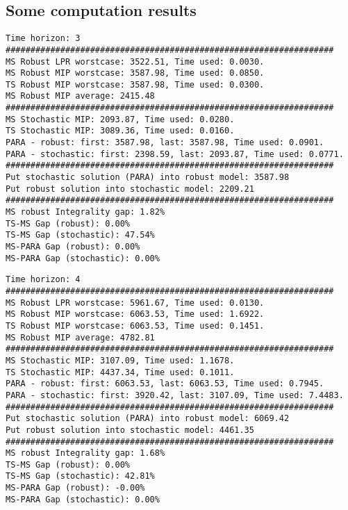 \documentclass[10pt]{article}
\theoremstyle{plain}
\theoremstyle{definition}
\theoremstyle{remark}
\begin{document}
\subsection*{Some computation results}
\begin{minipage}[t]{9cm}
\scriptsize
\begin{verbatim}
Time horizon: 3
##################################################################
MS Robust LPR worstcase: 3522.51, Time used: 0.0030.
MS Robust MIP worstcase: 3587.98, Time used: 0.0850.
TS Robust MIP worstcase: 3587.98, Time used: 0.0300.
MS Robust MIP average: 2415.48
##################################################################
MS Stochastic MIP: 2093.87, Time used: 0.0280.
TS Stochastic MIP: 3089.36, Time used: 0.0160.
PARA - robust: first: 3587.98, last: 3587.98, Time used: 0.0901.
PARA - stochastic: first: 2398.59, last: 2093.87, Time used: 0.0771.
##################################################################
Put stochastic solution (PARA) into robust model: 3587.98
Put robust solution into stochastic model: 2209.21
##################################################################
MS robust Integrality gap: 1.82%
TS-MS Gap (robust): 0.00%
TS-MS Gap (stochastic): 47.54%
MS-PARA Gap (robust): 0.00%
MS-PARA Gap (stochastic): 0.00%
\end{verbatim}
\end{minipage}
\begin{minipage}[t]{9cm}
\scriptsize
\begin{verbatim}
Time horizon: 4
##################################################################
MS Robust LPR worstcase: 5961.67, Time used: 0.0130.
MS Robust MIP worstcase: 6063.53, Time used: 1.6922.
TS Robust MIP worstcase: 6063.53, Time used: 0.1451.
MS Robust MIP average: 4782.81
##################################################################
MS Stochastic MIP: 3107.09, Time used: 1.1678.
TS Stochastic MIP: 4437.34, Time used: 0.1011.
PARA - robust: first: 6063.53, last: 6063.53, Time used: 0.7945.
PARA - stochastic: first: 3920.42, last: 3107.09, Time used: 7.4483.
##################################################################
Put stochastic solution (PARA) into robust model: 6069.42
Put robust solution into stochastic model: 4461.35
##################################################################
MS robust Integrality gap: 1.68%
TS-MS Gap (robust): 0.00%
TS-MS Gap (stochastic): 42.81%
MS-PARA Gap (robust): -0.00%
MS-PARA Gap (stochastic): 0.00%
\end{verbatim}
\end{minipage}
\end{document}
